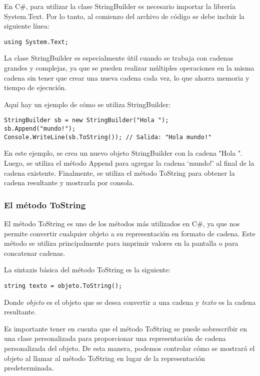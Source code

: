 \documentclass[executivepaper]{article}
\begin{document}
En C\#, para utilizar la clase StringBuilder es necesario importar la librería System.Text. Por lo tanto, al comienzo del archivo de código se debe incluir la siguiente línea:
\begin{lstlisting}
using System.Text;    
\end{lstlisting}

La clase StringBuilder es especialmente útil cuando se trabaja con cadenas grandes y complejas, ya que se pueden realizar múltiples operaciones en la misma cadena sin tener que crear una nueva cadena cada vez, lo que ahorra memoria y tiempo de ejecución.

Aquí hay un ejemplo de cómo se utiliza StringBuilder:
\begin{lstlisting}
StringBuilder sb = new StringBuilder("Hola ");
sb.Append("mundo!");
Console.WriteLine(sb.ToString()); // Salida: "Hola mundo!"    
\end{lstlisting}
En este ejemplo, se crea un nuevo objeto StringBuilder con la cadena "Hola ". Luego, se utiliza el método Append para agregar la cadena \enquote*{mundo!} al final de la cadena existente. Finalmente, se utiliza el método ToString para obtener la cadena resultante y mostrarla por consola.

\subsubsection*{El método ToString}

El método ToString es uno de los métodos más utilizados en C\#, ya que nos permite convertir cualquier objeto a su representación en formato de cadena. Este método se utiliza principalmente para imprimir valores en la pantalla o para concatenar cadenas.

La sintaxis básica del método ToString es la siguiente:

\begin{lstlisting}[language={[Sharp]C}]
string texto = objeto.ToString();
\end{lstlisting}

Donde \textit{objeto} es el objeto que se desea convertir a una cadena y \textit{texto} es la cadena resultante.

Es importante tener en cuenta que el método ToString se puede sobrescribir en una clase personalizada para proporcionar una representación de cadena personalizada del objeto. De esta manera, podemos controlar cómo se mostrará el objeto al llamar al método ToString en lugar de la representación predeterminada.
\end{document}

